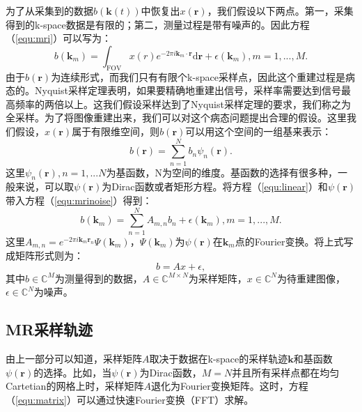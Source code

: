 为了从采集到的数据$b(\mathrm{\textbf{k}}(t))$中恢复出$x(\mathrm{\textbf{r}})$，我们假设以下两点。第一，采集得到的k-space数据是有限的；第二，测量过程是带有噪声的。因此方程（\ref{equ:mri}）可以写为：
\begin{equation}
	b(\mathrm{\textbf{k}}_m) = \int_{\mathrm{FOV}} x(r)e^{-2\pi i \mathrm{\textbf{k}}_m \cdot \mathrm{\textbf{r}}}\mathrm{d}\mathrm{\textbf{r}} + \epsilon(\mathrm{\textbf{k}}_m), m=1,...,M.
	\label{equ:mrinoise}
\end{equation}
由于$b(\mathrm{\textbf{r}})$为连续形式，而我们只有有限个k-space采样点，因此这个重建过程是病态的。Nyquist采样定理表明，如果要精确地重建出信号，采样率需要达到信号最高频率的两倍以上。这我们假设采样达到了Nyquist采样定理的要求，我们称之为全采样。为了将图像重建出来，我们可以对这个病态问题提出合理的假设。这里我们假设，$x(\mathrm{\textbf{r}})$属于有限维空间，则$b(\mathrm{\textbf{r}})$可以用这个空间的一组基来表示：
\begin{equation}
	b(\mathrm{\textbf{r}})=\sum_{n=1}^N b_n\psi_n(\mathrm{\textbf{r}}).
	\label{equ:linear}
\end{equation}
这里$\psi_{n}(\mathrm{\textbf{r}}), n=1,...N$为基函数，N为空间的维度。基函数的选择有很多种，一般来说，可以取$\psi(\mathrm{\textbf{r}})$为Dirac函数或者矩形方程。将方程（\ref{equ:linear}）和$\psi(\mathrm{\textbf{r}})$带入方程（\ref{equ:mrinoise}）得到：
\begin{equation}
	b(\mathrm{\textbf{k}}_m) = \sum_{n=1}^N A_{m,n}b_n + \epsilon(\mathrm{\textbf{k}}_m), m=1,...,M.
\end{equation}
这里$A_{m,n}=e^{-2\pi i\mathrm{\textbf{k}}_m\mathrm{\textbf{r}}_n}\Psi(\mathrm{\textbf{k}}_m)$，$\Psi(\mathrm{\textbf{k}}_m)$为$\psi(\mathrm{\textbf{r}})$在$\mathrm{\textbf{k}}_m$点的Fourier变换。将上式写成矩阵形式则为：
\begin{equation}
	b=Ax+\epsilon,
	\label{equ:matrix}
\end{equation}
其中$b\in \mathbb{C}^M$为测量得到的数据，$A\in \mathbb{C}^{M\times N}$为采样矩阵，$x\in \mathbb{C}^N$为待重建图像，$\epsilon \in \mathbb{C}^N$为噪声。

\subsection{MR采样轨迹}
由上一部分可以知道，采样矩阵$A$取决于数据在k-space的采样轨迹$\mathrm{\textbf{k}}$和基函数$\psi(\mathrm{\textbf{r}})$的选择。比如，当$\psi(\mathrm{\textbf{r}})$为Dirac函数，$M=N$并且所有采样点都在均匀Cartetian的网格上时，采样矩阵$A$退化为Fourier变换矩阵。这时，方程（\ref{equ:matrix}）可以通过快速Fourier变换（FFT）求解。


